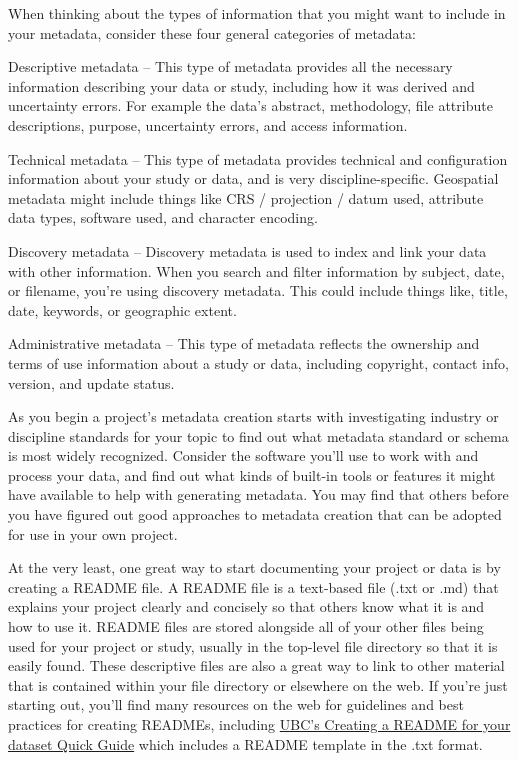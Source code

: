 \documentclass[
]{book}
\begin{document}
When thinking about the types of information that you might want to include in your metadata, consider these four general categories of metadata:

Descriptive metadata -- This type of metadata provides all the necessary information describing your data or study, including how it was derived and uncertainty errors. For example the data's abstract, methodology, file attribute descriptions, purpose, uncertainty errors, and access information.

Technical metadata -- This type of metadata provides technical and configuration information about your study or data, and is very discipline-specific. Geospatial metadata might include things like CRS / projection / datum used, attribute data types, software used, and character encoding.

Discovery metadata -- Discovery metadata is used to index and link your data with other information. When you search and filter information by subject, date, or filename, you're using discovery metadata. This could include things like, title, date, keywords, or geographic extent.

Administrative metadata -- This type of metadata reflects the ownership and terms of use information about a study or data, including copyright, contact info, version, and update status.

As you begin a project's metadata creation starts with investigating industry or discipline standards for your topic to find out what metadata standard or schema is most widely recognized. Consider the software you'll use to work with and process your data, and find out what kinds of built-in tools or features it might have available to help with generating metadata. You may find that others before you have figured out good approaches to metadata creation that can be adopted for use in your own project.

At the very least, one great way to start documenting your project or data is by creating a README file. A README file is a text-based file (.txt or .md) that explains your project clearly and concisely so that others know what it is and how to use it. README files are stored alongside all of your other files being used for your project or study, usually in the top-level file directory so that it is easily found. These descriptive files are also a great way to link to other material that is contained within your file directory or elsewhere on the web. If you're just starting out, you'll find many resources on the web for guidelines and best practices for creating READMEs, including \href{https://osf.io/aqxw3}{UBC's Creating a README for your dataset Quick Guide} which includes a README template in the .txt format.
\end{document}
